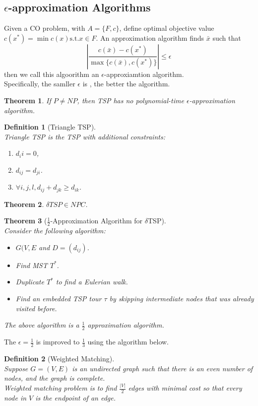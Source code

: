 \documentclass[12pt]{article}
\newcommand{\st}{\mathrm{s.t.}}
\newtheorem{definition}{Definition}[section]
\newtheorem{theorem}{Theorem}[section]
\theoremstyle{definition}
\begin{document}
\subsection{{$\epsilon$-approximation Algorithms}}
Given a CO problem, with $A=\{F,c\}$, define optimal objective value $c(x^\ast)=\min c(x)\st x\in F$. An approximation algorithm finds $\bar{x}$ such that
\[
|\frac{c(\bar{x})-c(x^\ast)}{\max\{c(\bar{x}),c(x^\ast)\}}|\leq \epsilon
\]
then we call this algoorithm an $\epsilon$-approxiamtion algorithm.\\
Specifically, the samller $\epsilon$ is , the better the algorithm.
\begin{theorem}\normalfont If $P\neq NP$, then TSP has no polynomial-time $\epsilon$-approximation algorithm.\end{theorem}
\begin{definition}[Triangle TSP]
\hfill\\\normalfont Triangle TSP is the TSP with additional constraints:
\begin{enumerate}
  \item $d_ii=0$,
  \item $d_{ij}=d_{ji}$.
  \item $\forall i,j,l, d_{ij}+d_{jk}\geq d_{ik}$.
\end{enumerate}
\end{definition}
\begin{theorem}\normalfont $\delta TSP\in NPC$.\end{theorem}
\begin{theorem}[{$\frac{1}2{}$-Approximation Algorithm for $\delta$TSP}]
\hfill\\\normalfont Consider the following algorithm:
\begin{itemize}
  \item[Step 0] $G(V,E$ and $D=(d_{ij})$.
  \item[Step 1] Find MST $T^\ast$.
  \item[Step 2] Duplicate $T^\ast$ to find a Eulerian walk.
  \item[Step 3] Find an embedded TSP tour $\tau$ by skipping intermediate nodes that was already visited before.
\end{itemize}
The above algorithm is a $\frac{1}{2}$ approximation algorithm.
\end{theorem}
The $\epsilon=\frac{1}{2}$ is improved to $\frac{1}{3}$ using the algorithm below.
\begin{definition}[Weighted Matching]
\hfill\\\normalfont Suppose $G=(V,E)$ is an undirected graph such that there is an even number of nodes, and the graph is complete.\\
Weighted matching problem is to find $\frac{|V|}{2}$ edges with minimal cost so that every node in $V$ is the endpoint of an edge.
\end{definition}
\end{document}
